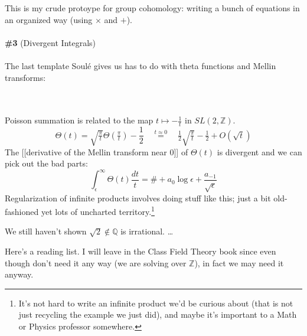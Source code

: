 \documentclass[12pt]{article}
\begin{document}
This is my crude protoype for group cohomology: writing a bunch of equations in an organized way (using $\times$ and $+$). \\ \\
\textbf{\#3} (Divergent Integrals) \\ \\
The last template Soul\'{e} gives us has to do with theta functions and Mellin transforms: \\ \\
 \\ 
Poisson summation is related to the map $t \mapsto - \frac{1}{t}$ in $SL(2, \mathbb{Z})$. 
$$ \Theta(t) = \sqrt{\tfrac{\pi}{t}} \Theta(\tfrac{\pi}{t})  - \frac{1}{2} 
 \quad\stackrel{t\approx 0}{=}\quad \tfrac{1}{2}\sqrt{\tfrac{\pi}{t}} - \tfrac{1}{2}   + O(\sqrt{t})$$
The [[derivative of the Mellin transform near $0$]] of $\Theta(t)$ is divergent and we can pick out the bad parts:
$$ \int_\epsilon^\infty \Theta(t)  \frac{dt}{t}
 = \# + a_0 \log \epsilon + \frac{a_{-1}}{\sqrt{\epsilon}} $$
 Regularization of infinite products involves doing stuff like this; just a bit old-fashioned yet lots of uncharted territory.\footnote{It's not hard to write an infinite product we'd be curious about (that is not just recycling the example we just did), and maybe it's important to a Math or Physics professor somewhere.}

\newpage

\noindent We still haven't shown $\sqrt{2} \notin \mathbb{Q}$ is irrational. \dots

\vfill


\noindent Here's a reading list. I will leave in the Class Field Theory book since even though don't need it any way (we are solving over $\mathbb{Z}$), in fact we may need it anyway.
\end{document}
